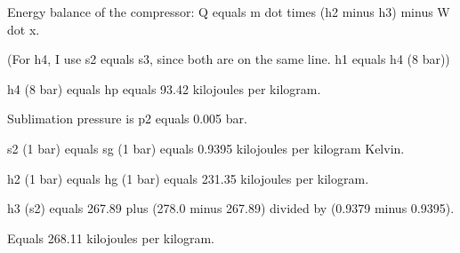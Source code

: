 Energy balance of the compressor:  
Q equals m dot times (h2 minus h3) minus W dot x.  

(For h4, I use s2 equals s3, since both are on the same line. h1 equals h4 (8 bar))  

h4 (8 bar) equals hp equals 93.42 kilojoules per kilogram.  

Sublimation pressure is p2 equals 0.005 bar.  

s2 (1 bar) equals sg (1 bar) equals 0.9395 kilojoules per kilogram Kelvin.  

h2 (1 bar) equals hg (1 bar) equals 231.35 kilojoules per kilogram.  

h3 (s2) equals 267.89 plus (278.0 minus 267.89) divided by (0.9379 minus 0.9395).  

Equals 268.11 kilojoules per kilogram.